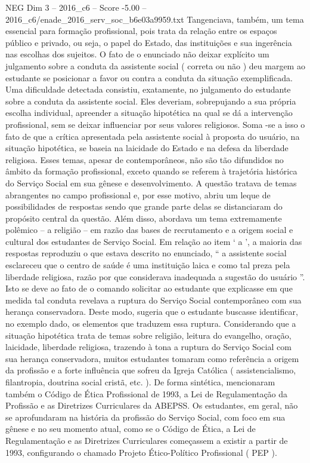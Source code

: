 \begin{textsample}{NEG Dim 3 – 2016\_c6 – Score -5.00 – 2016\_c6/enade\_2016\_serv\_soc\_b6e03a9959.txt}
Tangenciava, também, um tema essencial para formação profissional, pois trata da relação entre os espaços público e privado, ou seja, o papel do Estado, das instituições e sua ingerência nas escolhas dos sujeitos.
O fato de o enunciado não deixar explícito um julgamento sobre a conduta da assistente social ( correta ou não ) deu margem ao estudante se posicionar a favor ou contra a conduta da situação exemplificada.
Uma dificuldade detectada consistiu, exatamente, no julgamento do estudante sobre a conduta da assistente social.
Eles deveriam, sobrepujando a sua própria escolha individual, apreender a situação hipotética na qual se dá a intervenção profissional, sem se deixar influenciar por seus valores religiosos.
Soma -se a isso o fato de que a crítica apresentada pela assistente social à proposta do usuário, na situação hipotética, se baseia na laicidade do Estado e na defesa da liberdade religiosa.
Esses temas, apesar de contemporâneos, não são tão difundidos no âmbito da formação profissional, exceto quando se referem à trajetória histórica do Serviço Social em sua gênese e desenvolvimento.
A questão tratava de temas abrangentes no campo profissional e, por esse motivo, abriu um leque de possibilidades de respostas sendo que grande parte delas se distanciaram do propósito central da questão.
Além disso, abordava um tema extremamente polêmico – a religião – em razão das bases de recrutamento e a origem social e cultural dos estudantes de Serviço Social.
Em relação ao item ‘ a ’, a maioria das respostas reproduziu o que estava descrito no enunciado, “ a assistente social esclareceu que o centro de saúde é uma instituição laica e como tal preza pela liberdade religiosa, razão por que considerava inadequada a sugestão do usuário ”.
Isto se deve ao fato de o comando solicitar ao estudante que explicasse em que medida tal conduta revelava a ruptura do Serviço Social contemporâneo com sua herança conservadora.
Deste modo, sugeria que o estudante buscasse identificar, no exemplo dado, os elementos que traduzem essa ruptura.
Considerando que a situação hipotética trata de temas sobre religião, leitura do evangelho, oração, laicidade, liberdade religiosa, trazendo à tona a ruptura do Serviço Social com sua herança conservadora, muitos estudantes tomaram como referência a origem da profissão e a forte influência que sofreu da Igreja Católica ( assistencialismo, filantropia, doutrina social cristã, etc. ).
De forma sintética, mencionaram também o Código de Ética Profissional de 1993, a Lei de Regulamentação da Profissão e as Diretrizes Curriculares da ABEPSS.
Os estudantes, em geral, não se aprofundaram na história da profissão do Serviço Social, com foco em sua gênese e no seu momento atual, como se o Código de Ética, a Lei de Regulamentação e as Diretrizes Curriculares começassem a existir a partir de 1993, configurando o chamado Projeto Ético-Político Profissional ( PEP ).

\end{textsample}
